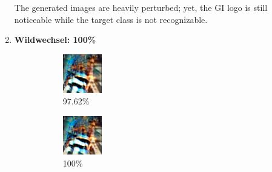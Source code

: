 \begin{enumerate}
The generated images are heavily perturbed;
yet, the GI logo is still noticeable while the target class is not recognizable.

\item
\textbf{Wildwechsel: 100\%}

\begin{figure}[!h]
\centering
\begin{subfigure}{.19\linewidth}
  \centering
  \includegraphics[width=0.7\linewidth]{imgs/robust_16/0_ll}
  \caption{97.62\%}
\end{subfigure}
\begin{subfigure}{.19\linewidth}
  \centering
  \includegraphics[width=0.7\linewidth]{imgs/robust_16/1_l}
  \caption{100\%}
\end{subfigure}
\begin{subfigure}{.19\linewidth}

\end{subfigure}
\end{figure}
\end{enumerate}
